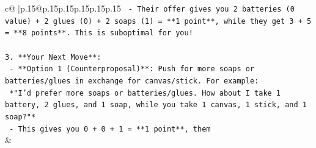 \documentclass{article}
\begin{document}
{\begin{supertabular}{c@{$\;$}|p{.15\linewidth}@{}p{.15\linewidth}p{.15\linewidth}p{.15\linewidth}p{.15\linewidth}p{.15\linewidth}}
{{{\texttt{   {-} Their offer gives you 2 batteries (0 value) + 2 glues (0) + 2 soaps (1) = **1 point**, while they get 3 + 5 = **8 points**. This is suboptimal for you!} \\
\\ 
\texttt{3. **Your Next Move**:} \\
\texttt{   {-} **Option 1 (Counterproposal)**: Push for more soaps or batteries/glues in exchange for canvas/stick. For example:} \\
\texttt{     *"I’d prefer more soaps or batteries/glues. How about I take 1 battery, 2 glues, and 1 soap, while you take 1 canvas, 1 stick, and 1 soap?"*} \\
\texttt{     {-} This gives you 0 + 0 + 1 = **1 point**, them} \\
            }
        }
    }
    & \\ \\


\end{supertabular}}
\end{document}
